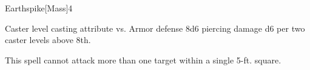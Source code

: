 \begin{spellsection}{Earthspike}[Mass]{4}
\begin{spellheader}
\end{spellheader}
\begin{spellcontent}
    \begin{spelltargetinginfo}
    \end{spelltargetinginfo}
    \begin{spelleffects}
        \begin{spellattack}{Caster level \add casting attribute vs. Armor defense}
            \spellsuccess 8d6 piercing damage \add d6 per two caster levels above 8th.
        \end{spellattack}
    \end{spelleffects}
\end{spellcontent}
\begin{spellfooter}
    \spellnotes This spell cannot attack more than one target within a single 5-ft. square.
\end{spellfooter}
\end{spellsection}

